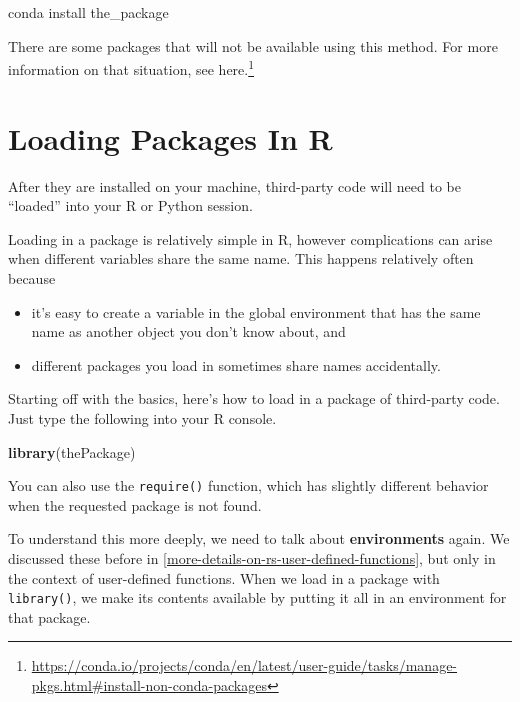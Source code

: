 \documentclass[12pt,krantz2]{krantz}
\makeatletter
\newenvironment{Shaded}{\begin{snugshade}}{\end{snugshade}}
\newcommand{\ExtensionTok}[1]{#1}
\newcommand{\KeywordTok}[1]{\textcolor[rgb]{0.27,0.27,0.27}{\textbf{#1}}}
\newcommand{\NormalTok}[1]{#1}
\providecommand{\tightlist}{%
  \setlength{\itemsep}{0pt}\setlength{\parskip}{0pt}}
\renewcommand{\href}[2]{#2\footnote{\url{#1}}}
\newenvironment{kframe}{%
\medskip{}
\setlength{\fboxsep}{.8em}
 \def\at@end@of@kframe{}%
 \ifinner\ifhmode%
  \def\at@end@of@kframe{\end{minipage}}%
  \begin{minipage}{\columnwidth}%
 \fi\fi%
 \def\FrameCommand##1{\hskip\@totalleftmargin \hskip-\fboxsep
 \colorbox{shadecolor}{##1}\hskip-\fboxsep
     \hskip-\linewidth \hskip-\@totalleftmargin \hskip\columnwidth}%
 \MakeFramed {\advance\hsize-\width
   \@totalleftmargin\z@ \linewidth\hsize
   \@setminipage}}%
 {\par\unskip\endMakeFramed%
 \at@end@of@kframe}
\renewenvironment{Shaded}{\begin{kframe}}{\end{kframe}}
\makeatother
\begin{document}
\begin{Shaded}
\begin{Highlighting}[]
\ExtensionTok{conda}\NormalTok{ install the_package}
\end{Highlighting}
\end{Shaded}

There are some packages that will not be available using this method. For more information on that situation, see \href{https://conda.io/projects/conda/en/latest/user-guide/tasks/manage-pkgs.html\#install-non-conda-packages}{here.}

\hypertarget{loading-packages-in-r}{%
\section{Loading Packages In R}\label{loading-packages-in-r}}

After they are installed on your machine, third-party code will need to be ``loaded'' into your R or Python session.

Loading in a package is relatively simple in R, however complications can arise when different variables share the same name. This happens relatively often because

\begin{itemize}
\tightlist
\item
  it's easy to create a variable in the global environment that has the same name as another object you don't know about, and
\item
  different packages you load in sometimes share names accidentally.
\end{itemize}

Starting off with the basics, here's how to load in a package of third-party code. Just type the following into your R console.

\begin{Shaded}
\begin{Highlighting}[]
\KeywordTok{library}\NormalTok{(thePackage)}
\end{Highlighting}
\end{Shaded}

You can also use the \texttt{require()} function, which has slightly different behavior when the requested package is not found.

To understand this more deeply, we need to talk about \textbf{environments} again. We discussed these before in \ref{more-details-on-rs-user-defined-functions}, but only in the context of user-defined functions. When we load in a package with \texttt{library()}, we make its contents available by putting it all in an environment for that package.
\end{document}
